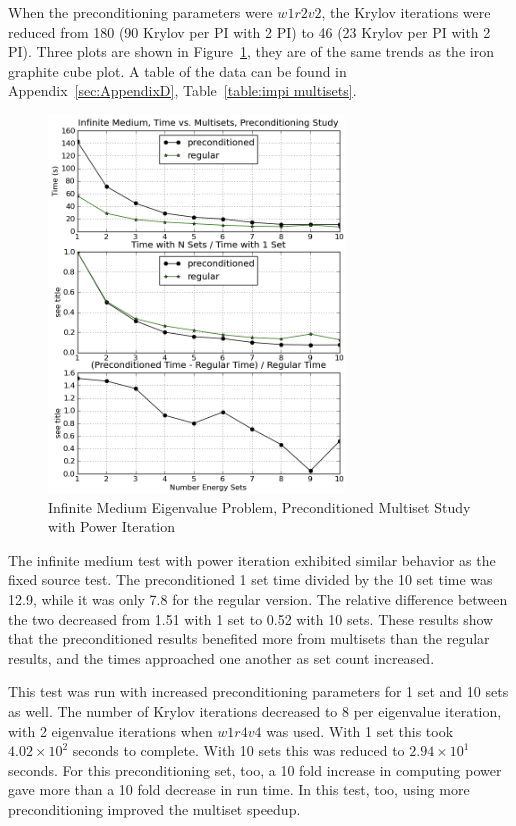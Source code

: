 When the preconditioning parameters were $w1r2v2$, the Krylov iterations were reduced from 180 (90 Krylov per PI with 2 PI) to 46 (23 Krylov per PI with 2 PI). Three plots are shown in Figure~\ref{fig:impi multisets}, they are of the same trends as the iron graphite cube plot. A table of the data can be found in Appendix~\ref{sec:AppendixD}, Table~\ref{table:impi multisets}.
%
\begin{figure}[!ht]
    \begin{center}
      \includegraphics [width=0.7\textwidth, height=0.8\textheight] {impimultisets}
   \end{center}
   \caption{Infinite Medium Eigenvalue Problem, Preconditioned Multiset Study with Power Iteration}
   \label{fig:impi multisets}
\end{figure}

The infinite medium test with power iteration exhibited similar behavior as the fixed source test. The preconditioned 1 set time divided by the 10 set time was 12.9, while it was only 7.8 for the regular version. The relative difference between the two decreased from 1.51 with 1 set to 0.52 with 10 sets. These results show that the preconditioned results benefited more from multisets than the regular results, and the times approached one another as set count increased. 

This test was run with increased preconditioning parameters for 1 set and 10 sets as well. The number of Krylov iterations decreased to 8 per eigenvalue iteration, with 2 eigenvalue iterations when $w1r4v4$ was used. With 1 set this took $4.02 \times 10^{2}$ seconds to complete. With 10 sets this was reduced to $2.94 \times 10^{1}$ seconds. For this preconditioning set, too, a 10 fold increase in computing power gave more than a 10 fold decrease in run time. In this test, too, using more preconditioning improved the multiset speedup. 
 
